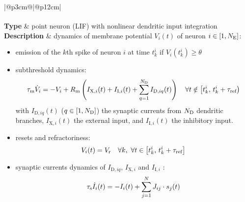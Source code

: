 \documentclass[10pt,a4paper,twoside,american]{article}
\newcommand{\exc}{\textnormal{E}}     %
\newcommand{\J}{J}                          %
\newcommand{\ND}{{N_{\textnormal{D}}}}
\newcommand{\RM}{R_\textnormal{m}}
\newcommand{\syn}{\textnormal{s}}
\newcommand{\tauM}{\tau_\textnormal{m}}
\newcommand{\tauR}{\tau_\textnormal{ref}}
\newcommand{\tauS}{\tau_\syn}
\newcommand{\Vreset}{V_\textnormal{r}}
\begin{document}
\setcounter{table}{\thetable-1}
\begin{table}[ht!]
\begin{tabular}{|@{\hspace*{1mm}}p{3cm}@{}|@{\hspace*{1mm}}p{12cm}|}
  \hline 
  \\
  \hline
  \\
  \hline
  \textbf{Type} & point neuron (LIF) with nonlinear dendritic input integration \\
  \hline
    \textbf{Description} & dynamics of membrane potential $V_{i}(t)$ of neuron $i\in[1,N_\exc]$:                
               \begin{itemize}
               \item emission of the $k$th spike of neuron $i$ at time $t_{k}^{i}$ if $V_{i}(t_{k}^{i})\geq\theta$ %
               \item subthreshold dynamics:
                 \begin{equation*}
                     \tauM\dot{V}_{i} =-V_{i}+\RM\left(I_{\text{X},i}(t) + I_{\text{I},i}(t)  + \sum_{q=1}^{\ND} I_{\text{D},iq}(t) \right)
                     \quad \forall t \notin \left[t_{k}^{i},\,t_{k}^{i}+\tauR\right)
                 \end{equation*}
                 with $I_{\text{D},iq}(t)$ ($q\in[1,\ND]$) the synaptic currents from $\ND$ dendritic branches, $I_{\text{X},i}(t)$ the external input, and $I_{\text{I},i}(t)$ the inhibitory input.
                  \item resets and refractoriness:
                  \begin{equation*}
                     V_{i}(t)=\Vreset
			  \quad \forall{}k,\ \forall t \in \left[t_{k}^{i},\,t_{k}^{i}+\tauR\right]
                 \end{equation*}
               \item  synaptic currents dynamics of $I_{\text{D},iq}$, $I_{\text{X},i}$ and $I_{\text{I},i}$ :
               \begin{equation*}
                 \tauS\dot{I}_{i}(t) = -I_{i}(t) + \sum_{j=1}^{N} \J_{ij} \cdot s_j(t)

\end{equation*}
\end{itemize}
\end{tabular}
\end{table}
\end{document}
